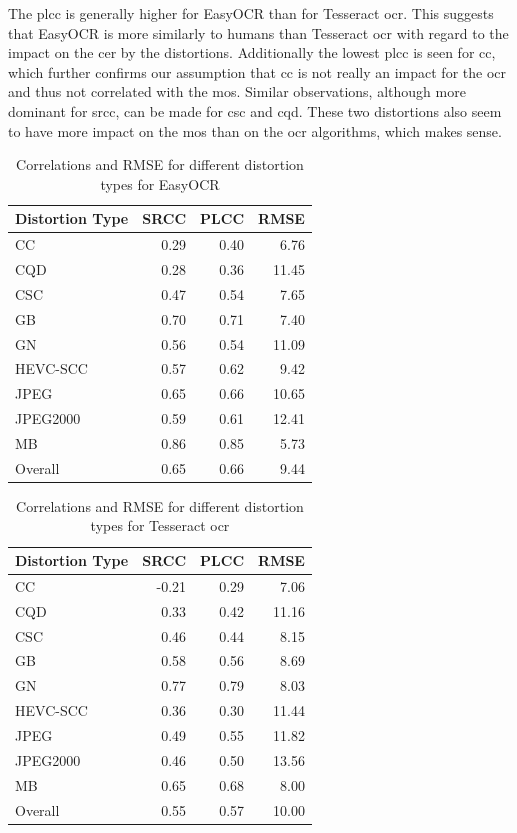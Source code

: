 The \gls{plcc} is generally higher for EasyOCR than for Tesseract \gls{ocr}.
This suggests that EasyOCR is more similarly to humans than Tesseract \gls{ocr} with regard to the impact on the \gls{cer} by the distortions.
Additionally the lowest \gls{plcc} is seen for \gls{cc}, which further confirms our assumption that \gls{cc} is not really an impact for the \gls{ocr} and thus not correlated with the \gls{mos}.
Similar observations, although more dominant for \gls{srcc}, can be made for \gls{csc} and \gls{cqd}.
These two distortions also seem to have more impact on the \gls{mos} than on the \gls{ocr} algorithms, which makes sense.

\begin{table}[h]
    \centering
    \begin{tabular}{|l|rrr|}
        \hline
        Distortion Type & SRCC & PLCC & RMSE \\
        \hline
        CC & 0.29 & 0.40 & 6.76 \\
        CQD & 0.28 & 0.36 & 11.45 \\
        CSC & 0.47 & 0.54 & 7.65 \\
        GB & 0.70 & 0.71 & 7.40 \\
        GN & 0.56 & 0.54 & 11.09 \\
        HEVC-SCC & 0.57 & 0.62 & 9.42 \\
        JPEG & 0.65 & 0.66 & 10.65 \\
        JPEG2000 & 0.59 & 0.61 & 12.41 \\
        MB & 0.86 & 0.85 & 5.73 \\
        \hline
        Overall & 0.65 & 0.66 & 9.44 \\
        \hline
    \end{tabular}
    \caption{Correlations and RMSE for different distortion types for EasyOCR}
    \label{tab:fitted_metrics_ezocr}
\end{table}

\begin{table}[h]
    \centering
    \begin{tabular}{|l|rrr|}
        \hline
        Distortion Type & SRCC & PLCC & RMSE \\
        \hline
        CC & -0.21 & 0.29 & 7.06 \\
        CQD & 0.33 & 0.42 & 11.16 \\
        CSC & 0.46 & 0.44 & 8.15 \\
        GB & 0.58 & 0.56 & 8.69 \\
        GN & 0.77 & 0.79 & 8.03 \\
        HEVC-SCC & 0.36 & 0.30 & 11.44 \\
        JPEG & 0.49 & 0.55 & 11.82 \\
        JPEG2000 & 0.46 & 0.50 & 13.56 \\
        MB & 0.65 & 0.68 & 8.00 \\
        \hline
        Overall & 0.55 & 0.57 & 10.00 \\
        \hline
    \end{tabular}
    \caption{Correlations and RMSE for different distortion types for Tesseract \gls{ocr}}
    \label{tab:fitted_metrics_tess}
\end{table}

